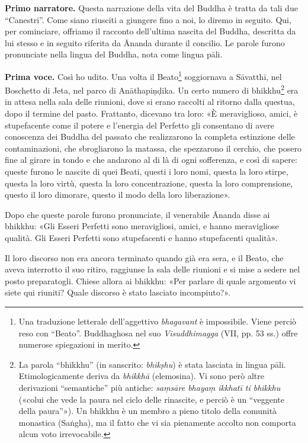 \textbf{Primo narratore.} Questa narrazione della vita del Buddha è tratta da
tali due “Canestri”. Come siano riusciti a giungere fino a noi, lo
diremo in seguito. Qui, per cominciare, offriamo il racconto dell’ultima
nascita del Buddha, descritta da lui stesso e in seguito riferita da
Ānanda durante il concilio. Le parole furono pronunciate nella lingua
del Buddha, nota come lingua pāli.


\textbf{Prima voce.} Così ho udito. Una volta il
Beato\footnote{Una traduzione letterale dell’aggettivo \emph{bhagavant} è impossibile. Viene perciò reso con “Beato”. Buddhaghosa nel suo \emph{Visuddhimagga} (VII, pp. 53 ss.) offre numerose spiegazioni in merito.} soggiornava a Sāvatthī, nel Boschetto di Jeta,
nel parco di Anāthapiṇḍika. Un certo numero di
bhikkhu\footnote{La parola “bhikkhu” (in sanscrito: \emph{bhikṣhu}) è stata lasciata in lingua pāli. Etimologicamente deriva da \emph{bhikkhā} (elemosina). Vi sono però altre derivazioni “semantiche” più antiche: \emph{saṃsāre bhayaṃ ikkhatī ti bhikkhu} («colui che vede la paura nel ciclo delle rinascite, e perciò è un “veggente della paura”»). Un bhikkhu è un membro a pieno titolo della comunità monastica (Saṅgha), ma il fatto che vi sia pienamente accolto non comporta alcun voto irrevocabile.} era in attesa nella sala delle riunioni, dove
si erano raccolti al ritorno dalla questua, dopo il termine del pasto.
Frattanto, dicevano tra loro: «È meraviglioso, amici, è stupefacente
come il potere e l’energia del Perfetto gli consentano di avere
conoscenza dei Buddha del passato che realizzarono la completa
estinzione delle contaminazioni, che sbrogliarono la matassa, che
spezzarono il cerchio, che posero fine al girare in tondo e che andarono
al di là di ogni sofferenza, e così di sapere: queste furono le nascite
di quei Beati, questi i loro nomi, questa la loro stirpe, questa la loro
virtù, questa la loro concentrazione, questa la loro comprensione,
questo il loro dimorare, questo il modo della loro liberazione».


Dopo che queste parole furono pronunciate, il venerabile Ānanda disse ai
bhikkhu: «Gli Esseri Perfetti sono meravigliosi, amici, e hanno
meravigliose qualità. Gli Esseri Perfetti sono stupefacenti e hanno
stupefacenti qualità».


Il loro discorso non era ancora terminato quando già era sera, e il
Beato, che aveva interrotto il suo ritiro, raggiunse la sala delle
riunioni e si mise a sedere nel posto preparatogli. Chiese allora ai
bhikkhu: «Per parlare di quale argomento vi siete qui riuniti? Quale
discorso è stato lasciato incompiuto?».


